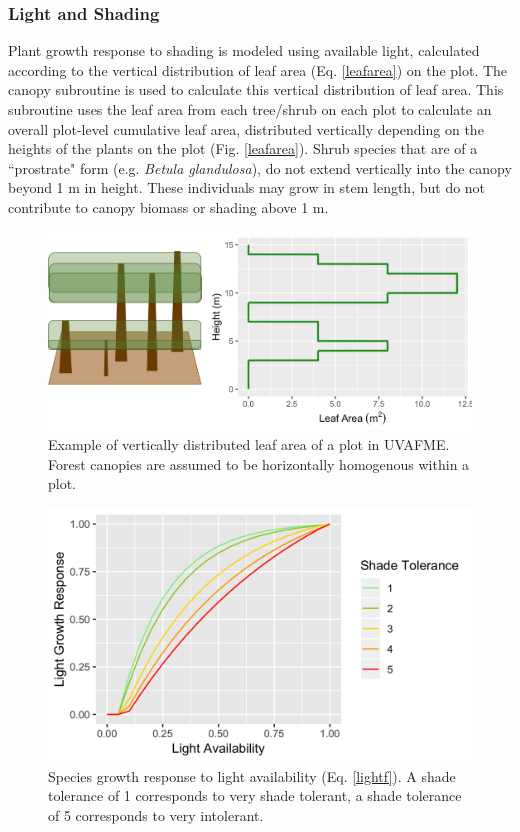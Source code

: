 \documentclass[a4paper, 12pt] {report}
\begin{document}
\subsubsection{Light and Shading}

Plant growth response to shading is modeled using available light, calculated according to the vertical distribution of leaf area (Eq. \ref{leafarea}) on the plot. The canopy subroutine is used to calculate this vertical distribution of leaf area. This subroutine uses the leaf area from each tree/shrub on each plot to calculate an overall plot-level cumulative leaf area, distributed vertically depending on the heights of the plants on the plot (Fig. \ref{leafarea}). Shrub species that are of a ``prostrate" form (e.g. \textit{Betula glandulosa}), do not extend vertically into the canopy beyond 1 m in height. These individuals may grow in stem length, but do not contribute to canopy biomass or shading above 1 m.


\begin{figure}
  \includegraphics[width=0.9\linewidth]{Figures/Forest_LeafARea.png}
  \caption{Example of vertically distributed leaf area of a plot in UVAFME. Forest canopies are assumed to be horizontally homogenous within a plot.}
  \label{fig:leafarea}
\end{figure}

\begin{figure}[H]
  \includegraphics[width=0.9\linewidth]{Figures/lightResp.png}
    \caption{Species growth response to light availability (Eq. \ref{lightf}). A shade tolerance of 1 corresponds to very shade tolerant, a shade tolerance of 5 corresponds to very intolerant.}
  \label{fig:flight}
\end{figure}
\end{document}
